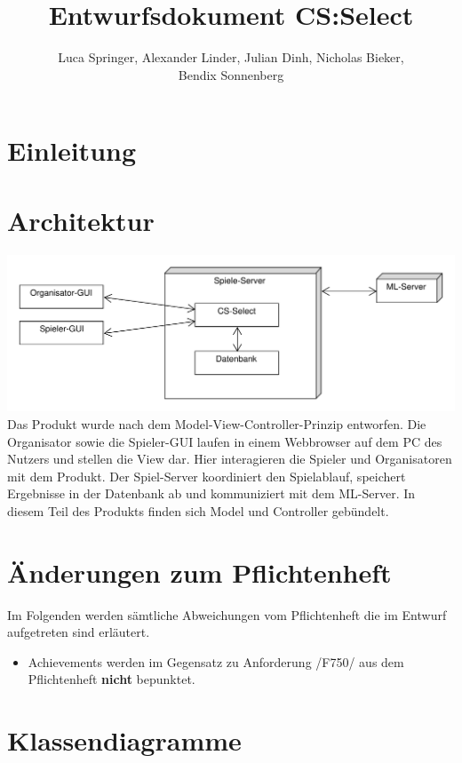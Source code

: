 \documentclass[a4paper]{scrreprt}
\begin{document}
	\title{Entwurfsdokument CS:Select}
	\author{Luca Springer, Alexander Linder, Julian Dinh, Nicholas Bieker,\\ Bendix Sonnenberg}
	\maketitle
	
	\tableofcontents


	\chapter{Einleitung}


	\chapter{Architektur}
	\includegraphics[width=\textwidth]{img/Architektur.pdf}
    Das Produkt wurde nach dem Model-View-Controller-Prinzip entworfen.
	Die Organisator sowie die Spieler-GUI laufen in einem Webbrowser auf dem PC des Nutzers und stellen die View dar.
	Hier interagieren die Spieler und Organisatoren mit dem Produkt.
	Der Spiel-Server koordiniert den Spielablauf, speichert Ergebnisse in der Datenbank ab und kommuniziert mit dem ML-Server.
    In diesem Teil des Produkts finden sich Model und Controller gebündelt.

	\chapter{Änderungen zum Pflichtenheft}
	Im Folgenden werden sämtliche Abweichungen vom Pflichtenheft die im Entwurf aufgetreten sind erläutert.
	\begin{itemize}
		\item Achievements werden im Gegensatz zu Anforderung /F750/ aus dem Pflichtenheft \textbf{nicht} bepunktet.
	\end{itemize}
	
	\chapter{Klassendiagramme}
\end{document}
